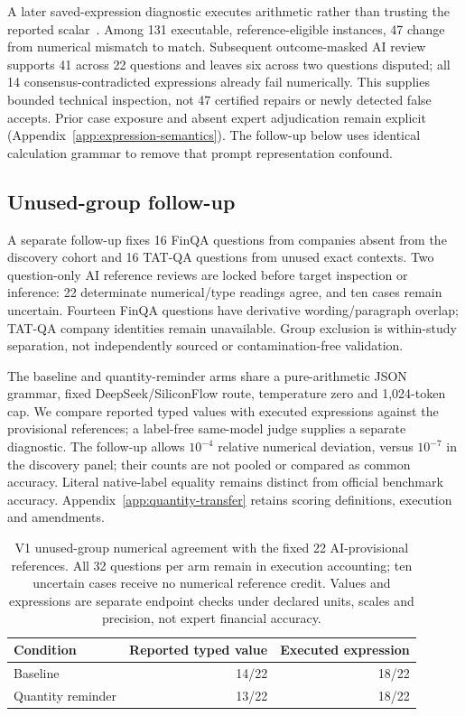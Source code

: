 A later saved-expression diagnostic executes arithmetic rather than trusting the reported scalar~\cite{pot}. Among 131 executable, reference-eligible instances, 47 change from numerical mismatch to match. Subsequent outcome-masked AI review supports 41 across 22 questions and leaves six across two questions disputed; all 14 consensus-contradicted expressions already fail numerically. This supplies bounded technical inspection, not 47 certified repairs or newly detected false accepts. Prior case exposure and absent expert adjudication remain explicit (Appendix~\ref{app:expression-semantics}). The follow-up below uses identical calculation grammar to remove that prompt representation confound.

\subsection{Unused-group follow-up}\label{sec:quantity-transfer}
A separate follow-up fixes 16 FinQA questions from companies absent from the discovery cohort and 16 TAT-QA questions from unused exact contexts. Two question-only AI reference reviews are locked before target inspection or inference: 22 determinate numerical/type readings agree, and ten cases remain uncertain. Fourteen FinQA questions have derivative wording/paragraph overlap; TAT-QA company identities remain unavailable. Group exclusion is within-study separation, not independently sourced or contamination-free validation.

The baseline and quantity-reminder arms share a pure-arithmetic JSON grammar, fixed DeepSeek/SiliconFlow route, temperature zero and 1,024-token cap. We compare reported typed values with executed expressions against the provisional references; a label-free same-model judge supplies a separate diagnostic. The follow-up allows $10^{-4}$ relative numerical deviation, versus $10^{-7}$ in the discovery panel; their counts are not pooled or compared as common accuracy. Literal native-label equality remains distinct from official benchmark accuracy. Appendix~\ref{app:quantity-transfer} retains scoring definitions, execution and amendments.

\begin{table}[!ht]
\centering\small
\begin{tabular}{lrr}
\toprule
Condition & Reported typed value & Executed expression\\
\midrule
Baseline & 14/22 & 18/22\\
Quantity reminder & 13/22 & 18/22\\
\bottomrule
\end{tabular}
\caption{V1 unused-group numerical agreement with the fixed 22 AI-provisional references. All 32 questions per arm remain in execution accounting; ten uncertain cases receive no numerical reference credit. Values and expressions are separate endpoint checks under declared units, scales and precision, not expert financial accuracy.}
\label{tab:quantity-transfer}
\end{table}

